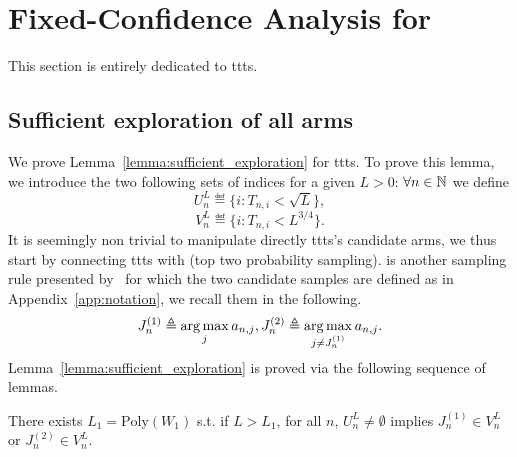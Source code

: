 \section{Fixed-Confidence Analysis for \texorpdfstring{\TTTS}{}}\label{app:confidence_ttts}

This section is entirely dedicated to \gls{ttts}.

\subsection{Sufficient exploration of all arms}\label{app:confidence_ttts.exploration}

We prove Lemma~\ref{lemma:sufficient_exploration} for \gls{ttts}. To prove this lemma, we introduce the two following sets of indices for a given $L>0$: $\forall n\in{\mathbb N}$ we define
\[
    U_n^L \eqdef \{i: T_{n,i} < \sqrt{L}\},
\]
\[
    V_n^L \eqdef \{i: T_{n,i} < L^{3/4}\}.
\]
It is seemingly non trivial to manipulate directly \gls{ttts}'s candidate arms, we thus start by connecting \gls{ttts} with \TTPS (top two probability sampling). \TTPS is another sampling rule presented by~\cite{russo2016ttts} for which the two candidate samples are defined as in Appendix~\ref{app:notation}, we recall them in the following.
\[
    J_n^{(1)} \triangleq \operatorname*{arg\,max}_{j} a_{n,j}, J_n^{(2)} \triangleq \operatorname*{arg\,max}_{j\neq J_n^{(1)}} a_{n,j}.
\]
Lemma~\ref{lemma:sufficient_exploration} is proved via the following sequence of lemmas.

\begin{lemma}\label{lemma:link_ttps}
\begin{leftbar}[lemmabar]
    There exists $L_1 = \text{Poly}(W_1)$ s.t. if $L > L_1$, for all $n$, $U_n^L \neq \emptyset$ implies $J_n^{(1)} \in V_n^L$ or $J_n^{(2)} \in V_n^L$.
\end{leftbar}
\end{lemma}

